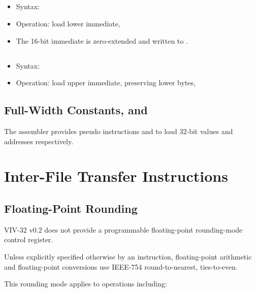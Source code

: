 \subsection{}

\begin{itemize}
  \item Syntax: 
  \item Operation: load lower immediate, 
  \item The 16-bit immediate is zero-extended and written to .
\end{itemize}

\subsection{}

\begin{itemize}
  \item Syntax: 
  \item Operation: load upper immediate, preserving lower bytes,

\end{itemize}

\subsection{Full-Width Constants,  and }

The assembler provides pseudo instructions  and  to load
32-bit values and addresses respectively.

\section{Inter-File Transfer Instructions}

\subsection{Floating-Point Rounding}

VIV-32 v0.2 does not provide a programmable floating-point rounding-mode
control register.

Unless explicitly specified otherwise by an instruction, floating-point
arithmetic and floating-point conversions use IEEE-754 round-to-nearest,
ties-to-even.

This rounding mode applies to operations including:


